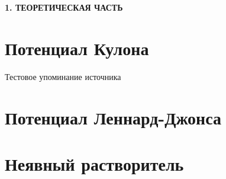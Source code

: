 \newpage
\begin{center}
  \textbf{\large 1. ТЕОРЕТИЧЕСКАЯ ЧАСТЬ}
\end{center}

\section{Потенциал Кулона}

Тестовое упоминание источника \cite{666.666}

\section{Потенциал Леннард-Джонса}

\section{Неявный растворитель}